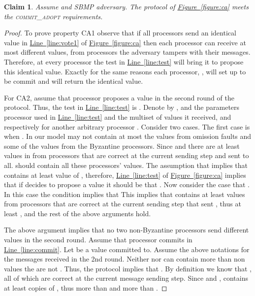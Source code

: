 \documentclass[11pt]{article}
\newtheorem{claim}{Claim}
\newcommand{\namedref}[2]{\hyperref[#2]{#1~\ref*{#2}}}
\newcommand{\figureref}[1]{\namedref{Figure}{#1}}
\newcommand{\lref}[1]{\namedref{Line}{#1}}
\newcommand{\SBMPfm}{\mbox{SBMP\!}\xspace}
\newcommand{\ca}{{\small\textsc{commit\!\_adopt}}\xspace}
\begin{document}
\begin{claim}\label{claim:CA}
Assume  and \SBMPfm adversary.  The protocol of \figureref{figure:ca} meets the \ca requirements.
\end{claim}
\begin{proof}
To prove property CA1 observe that if all processors send an identical value in \lref{line:vote1} of \figureref{figure:ca} then each processor can receive at most   different values, from processors the adversary tampers with their messages. Therefore, at every processor the test in \lref{line:test} will bring it to propose this identical value.  Exactly for the same reasons each processor, , will set up  to be {\sc commit} and will return the identical value.

For CA2, assume that  processor  proposes a value in the second round of the protocol. Thus, the test in \lref{line:test} is .
Denote by  ,   and   the parameters processor  used in \lref{line:test} and  the multiset of  values it received, and 
respectively for another arbitrary processor .  
Consider two cases. The first case is when . 
In our model  may not contain at most the  values from omission faults and some of the values from the Byzantine processors. Since  and  there are at least  
values in  from  processors that are correct at the current sending step  and sent  to all.   should contain all these processors' values. The assumption that  implies that  contains at least  value of , therefore, \lref{line:test} of \figureref{figure:ca} implies that if  decides to propose a value it should be that .  Now consider the case that .  In this case the condition  implies that  This implies that   contains at least   values from  processors that are correct at the current sending step that sent , thus at least , and the rest of the above arguments hold.

The above argument implies that no two non-Byzantine processors send different values in the second round. 
Assume that  processor  commits in \lref{line:commit}.
Let  be a value committed to.  
Assume the above notations for the messages received in the 2nd round.
Neither  nor  can contain more than  non  values the are not .
Thus, the protocol implies that .
By definition we know that , all of which are correct at the current message sending step. 
Since  and ,   contains at least  copies of , thus more than  and more than .  
\end{proof}
\end{document}
